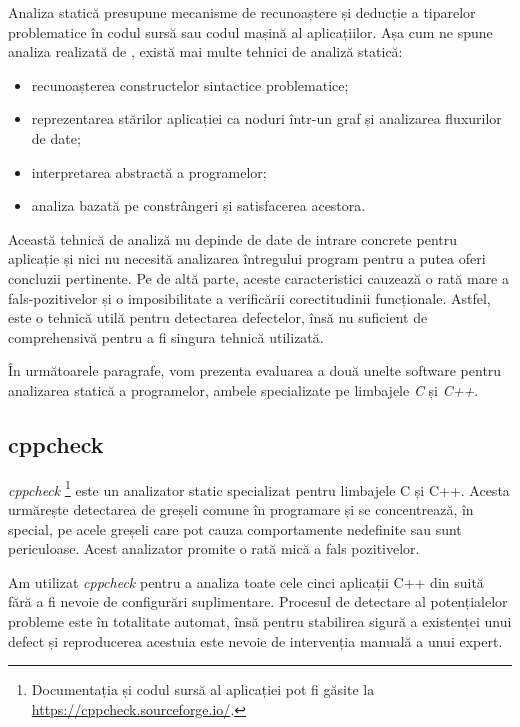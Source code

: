 Analiza statică presupune mecanisme de recunoaștere și deducție a tiparelor problematice în codul sursă sau codul mașină al aplicațiilor. Așa cum ne spune analiza realizată de \citet{Gosain2015}, există mai multe tehnici de analiză statică:
\begin{itemize}
    \item recunoașterea constructelor sintactice problematice;
    \item reprezentarea stărilor aplicației ca noduri într-un graf și analizarea fluxurilor de date;
    \item interpretarea abstractă a programelor;
    \item analiza bazată pe constrângeri și satisfacerea acestora.
\end{itemize}

Această tehnică de analiză nu depinde de date de intrare concrete pentru aplicație și nici nu necesită analizarea întregului program pentru a putea oferi concluzii pertinente. Pe de altă parte, aceste caracteristici cauzează o rată mare a fals-pozitivelor și o imposibilitate a verificării corectitudinii funcționale. Astfel, este o tehnică utilă pentru detectarea defectelor, însă nu suficient de comprehensivă pentru a fi singura tehnică utilizată.

În următoarele paragrafe, vom prezenta evaluarea a două unelte software pentru analizarea statică a programelor, ambele specializate pe limbajele \textit{C} și \textit{C++}.

\subsection*{cppcheck}

\textit{cppcheck} \footnote{Documentația și codul sursă al aplicației pot fi găsite la \url{https://cppcheck.sourceforge.io/}.} este un analizator static specializat pentru limbajele C și C++. Acesta urmărește detectarea de greșeli comune în programare și se concentrează, în special, pe acele greșeli care pot cauza comportamente nedefinite sau sunt periculoase. Acest analizator promite o rată mică a fals pozitivelor.

Am utilizat \textit{cppcheck} pentru a analiza toate cele cinci aplicații C++ din suită fără a fi nevoie de configurări suplimentare. Procesul de detectare al potențialelor probleme este în totalitate automat, însă pentru stabilirea sigură a existenței unui defect și reproducerea acestuia este nevoie de intervenția manuală a unui expert.

